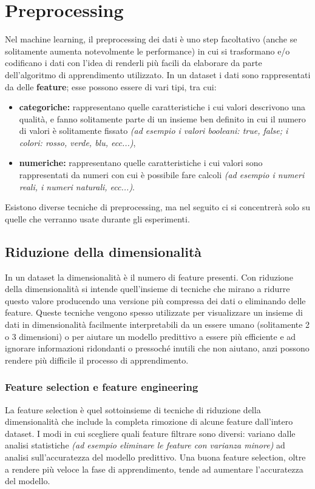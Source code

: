 \documentclass[12pt, twoside, letterpaper]{report}
\begin{document}
		\section{Preprocessing}
			Nel machine learning, il preprocessing dei dati è uno step facoltativo (anche se solitamente aumenta notevolmente le performance) in cui si trasformano e/o codificano i dati con l'idea di renderli più facili da elaborare da parte dell'algoritmo di apprendimento utilizzato. In un dataset i dati sono rappresentati da delle \textbf{feature}; esse possono essere di vari tipi, tra cui: 
			
			\begin{itemize}
				\item \textbf{categoriche:} rappresentano quelle caratteristiche i cui valori descrivono una qualità, e fanno solitamente parte di un insieme ben definito in cui il numero di valori è solitamente fissato \textit{(ad esempio i valori booleani: true, false; i colori: rosso, verde, blu, ecc...)},
				\item \textbf{numeriche:} rappresentano quelle caratteristiche i cui valori sono rappresentati da numeri con cui è possibile fare calcoli \textit{(ad esempio i numeri reali, i numeri naturali, ecc...)}.
			\end{itemize}
			Esistono diverse tecniche di preprocessing, ma nel seguito ci si concentrerà solo su quelle che verranno usate durante gli esperimenti.
			
			\subsection{Riduzione della dimensionalità} In un dataset la dimensionalità è il numero di feature presenti. Con riduzione della dimensionalità si intende quell'insieme di tecniche che mirano a ridurre questo valore producendo una versione più compressa dei dati o eliminando delle feature. Queste tecniche vengono spesso utilizzate per visualizzare un insieme di dati in dimensionalità facilmente interpretabili da un essere umano (solitamente 2 o 3 dimensioni) o per aiutare un modello predittivo a essere più efficiente e ad ignorare informazioni ridondanti o pressoché inutili che non aiutano, anzi possono rendere più difficile il processo di apprendimento. 
			
				\subsubsection{Feature selection e feature engineering} La feature selection è quel sottoinsieme di tecniche di riduzione della dimensionalità che include la completa rimozione di alcune feature dall'intero dataset. I modi in cui scegliere quali feature filtrare sono diversi: variano dalle analisi statistiche \textit{(ad esempio eliminare le feature con varianza minore)} ad analisi sull'accuratezza del modello predittivo. Una buona feature selection, oltre a rendere più veloce la fase di apprendimento, tende ad aumentare l'accuratezza del modello. %
				
\end{document}

